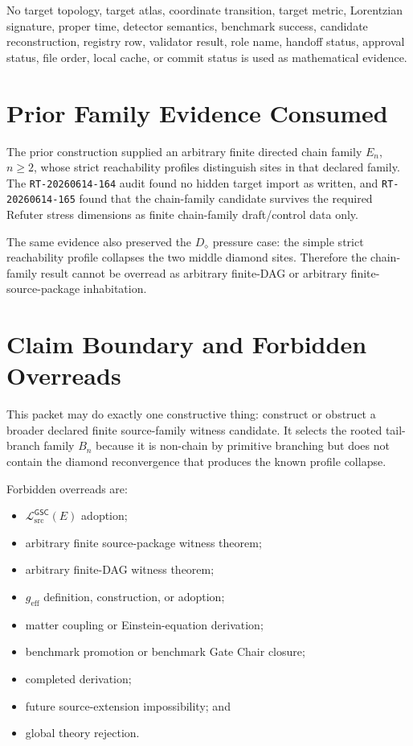 \documentclass[11pt]{article}
\newcommand{\MetricData}{\mathcal{L}_{\mathrm{src}}^{\mathsf{GSC}}}
\newcommand{\geff}{g_{\mathrm{eff}}}
\newcommand{\En}{E_n}
\newcommand{\Bn}{B_n}
\newcommand{\Diamond}{D_{\diamond}}
\begin{document}
No target topology, target atlas, coordinate transition, target metric,
Lorentzian signature, proper time, detector semantics, benchmark success,
candidate reconstruction, registry row, validator result, role name, handoff
status, approval status, file order, local cache, or commit status is used as
mathematical evidence.

\section{Prior Family Evidence Consumed}
\label{prior-family-evidence-consumed}

The prior construction supplied an arbitrary finite directed chain family
\(\En\), \(n\ge 2\), whose strict reachability profiles distinguish sites in
that declared family. The \texttt{RT-20260614-164} audit found no hidden target
import as written, and \texttt{RT-20260614-165} found that the chain-family
candidate survives the required Refuter stress dimensions as finite
chain-family draft/control data only.

The same evidence also preserved the \(\Diamond\) pressure case: the simple
strict reachability profile collapses the two middle diamond sites. Therefore
the chain-family result cannot be overread as arbitrary finite-DAG or
arbitrary finite-source-package inhabitation.

\section{Claim Boundary and Forbidden Overreads}
\label{claim-boundary-and-forbidden-overreads}

This packet may do exactly one constructive thing: construct or obstruct a
broader declared finite source-family witness candidate. It selects the rooted
tail-branch family \(\Bn\) because it is non-chain by primitive branching but
does not contain the diamond reconvergence that produces the known profile
collapse.

Forbidden overreads are:
\begin{itemize}[leftmargin=*]
  \item \(\MetricData(E)\) adoption;
  \item arbitrary finite source-package witness theorem;
  \item arbitrary finite-DAG witness theorem;
  \item \(\geff\) definition, construction, or adoption;
  \item matter coupling or Einstein-equation derivation;
  \item benchmark promotion or benchmark Gate Chair closure;
  \item completed derivation;
  \item future source-extension impossibility; and
  \item global theory rejection.
\end{itemize}
\end{document}
